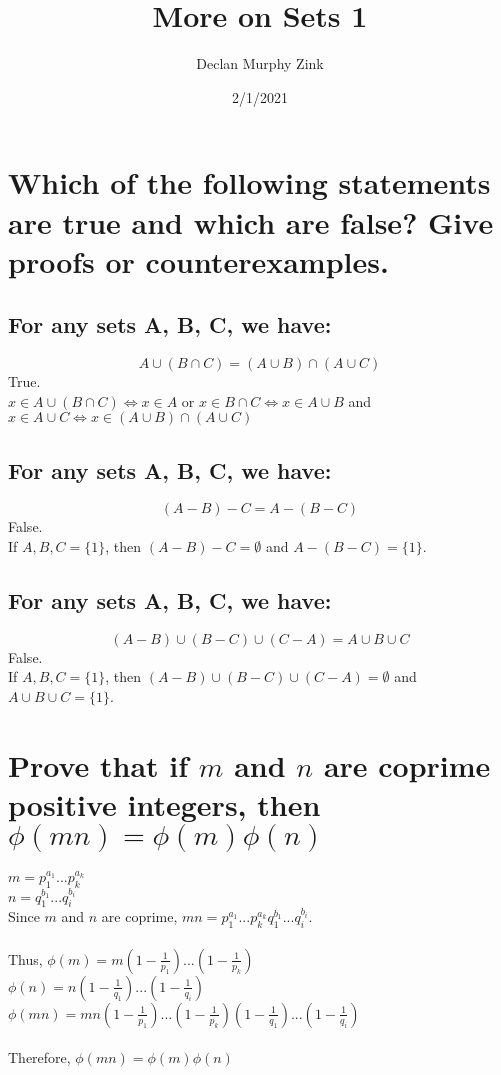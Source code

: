 \documentclass[12pt]{article}
\begin{document}
\title{More on Sets 1}
\author{Declan Murphy Zink}
\date{2/1/2021}
\maketitle

\setcounter{section}{1}

\section{Which of the following statements are true and which are false? Give proofs or counterexamples.}
\subsection{For any sets A, B, C, we have:}
$$A \cup (B \cap C) = (A \cup B) \cap (A \cup C)$$
True.\\
$x \in A \cup (B \cap C) \Leftrightarrow x \in A$ or $x \in B \cap C \Leftrightarrow x \in A \cup B$ and $x \in A \cup C \Leftrightarrow x \in (A \cup B) \cap (A \cup C)$

\subsection{For any sets A, B, C, we have:}
$$(A-B)-C = A-(B-C)$$
False.\\
If $A, B, C = \{1\}$, then $(A-B)-C = \emptyset$ and $A-(B-C) = \{1\}$.

\subsection{For any sets A, B, C, we have:}
$$(A-B) \cup (B-C) \cup (C-A) = A \cup B \cup C$$
False.\\
If $A, B, C = \{1\}$, then $(A-B) \cup (B-C) \cup (C-A) = \emptyset$ and $A \cup B \cup C = \{1\}$.

\setcounter{section}{10}
\section{Prove that if $m$ and $n$ are coprime positive integers, then $\phi(mn) = \phi(m)\phi(n)$}
$m = p_1^{a_1}...p_k^{a_k}$\\
$n = q_1^{b_1}...q_i^{b_i}$\\
Since $m$ and $n$ are coprime, $mn = p_1^{a_1}...p_k^{a_k}q_1^{b_1}...q_i^{b_i}$.\\\\
Thus, $\phi(m) = m(1-\frac{1}{p_1})...(1-\frac{1}{p_k})$\\
$\phi(n) = n(1-\frac{1}{q_1})...(1-\frac{1}{q_i})$\\
$\phi(mn) = mn(1-\frac{1}{p_1})...(1-\frac{1}{p_k})(1-\frac{1}{q_1})...(1-\frac{1}{q_i})$\\\\
Therefore, $\phi(mn) = \phi(m)\phi(n)$
\end{document}
